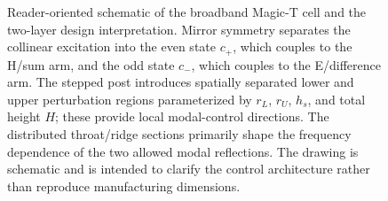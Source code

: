 \begin{figure}[t]
\caption{Reader-oriented schematic of the broadband Magic-T cell and the two-layer design interpretation. Mirror symmetry separates the collinear excitation into the even state $c_+$, which couples to the H/sum arm, and the odd state $c_-$, which couples to the E/difference arm. The stepped post introduces spatially separated lower and upper perturbation regions parameterized by $r_L$, $r_U$, $h_s$, and total height $H$; these provide local modal-control directions. The distributed throat/ridge sections primarily shape the frequency dependence of the two allowed modal reflections. The drawing is schematic and is intended to clarify the control architecture rather than reproduce manufacturing dimensions.}
\label{fig:geometry-schematic}
\end{figure}
